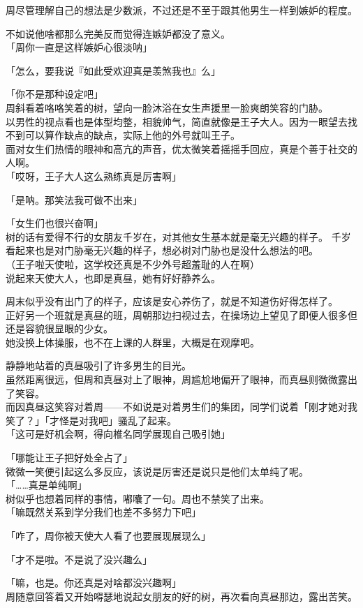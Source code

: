 周尽管理解自己的想法是少数派，不过还是不至于跟其他男生一样到嫉妒的程度。

不如说他啥都那么完美反而觉得连嫉妒都没了意义。\\

「周你一直是这样嫉妒心很淡呐」

「怎么，要我说『如此受欢迎真是羡煞我也』么」

「你不是那种设定吧」\\

周斜看着咯咯笑着的树，望向一脸沐浴在女生声援里一脸爽朗笑容的门胁。\\

以男性的视点看也是体型均整，相貌帅气，简直就像是王子大人。因为一眼望去找不到可以算作缺点的缺点，实际上他的外号就叫王子。\\

面对女生们热情的眼神和高亢的声音，优太微笑着摇摇手回应，真是个善于社交的人啊。\\

「哎呀，王子大人这么熟练真是厉害啊」

「是呐。那笑法我可做不出来」

「女生们也很兴奋啊」\\

树的话有爱得不行的女朋友千岁在，对其他女生基本就是毫无兴趣的样子。
千岁看起来也是对门胁毫无兴趣的样子，想必树对门胁也是没什么想法的吧。\\

（王子啦天使啦，这学校还真是不少外号超羞耻的人在啊）\\

说起来天使大人，也即是真昼，她有好好静养么。

周末似乎没有出门了的样子，应该是安心养伤了，就是不知道伤好得怎样了。\\

正好另一个班就是真昼的班，周朝那边扫视过去，在操场边上望见了即便人很多但还是容貌很显眼的少女。\\

她没换上体操服，也不在上课的人群里，大概是在观摩吧。

静静地站着的真昼吸引了许多男生的目光。\\

虽然距离很远，但周和真昼对上了眼神，周尴尬地偏开了眼神，而真昼则微微露出了笑容。\\

而因真昼这笑容对着周——不如说是对着男生们的集团，同学们说着「刚才她对我笑了？」「才怪是对我吧」骚乱了起来。\\

「这可是好机会啊，得向椎名同学展现自己吸引她」

「哪能让王子把好处全占了」\\

微微一笑便引起这么多反应，该说是厉害还是说只是他们太单纯了呢。\\

「……真是单纯啊」\\

树似乎也想着同样的事情，嘟囔了一句。周也不禁笑了出来。\\

「嘛既然关系到学分我们也差不多努力下吧」

「咋了，周你被天使大人看了也要展现展现么」

「才不是啦。不是说了没兴趣么」

「嘛，也是。你还真是对啥都没兴趣啊」\\

周随意回答着又开始嘚瑟地说起女朋友的好的树，再次看向真昼那边，露出苦笑。
